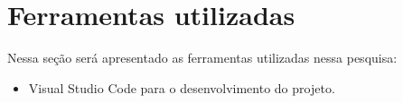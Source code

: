 \section{Ferramentas utilizadas}

\noindent Nessa seção será apresentado as ferramentas utilizadas nessa pesquisa:
\begin{itemize}
\item Visual Studio Code para o desenvolvimento do projeto.
\end{itemize}